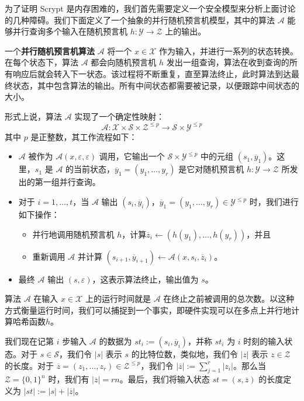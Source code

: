 \begin{snote}
为了证明 Scrypt 是内存困难的，我们首先需要定义一个安全模型来分析上面讨论的几种障碍。我们下面定义了一个抽象的并行随机预言机模型，其中的算法 $\mathcal{A}$ 能够并行查询多个输入在随机预言机 $h:\mathcal{Y}\to\mathcal{Z}$ 上的输出。

一个\textbf{并行随机预言机算法} $\mathcal{A}$ 将一个 $x\in\mathcal{X}$ 作为输入，并进行一系列的状态转换。在每个状态下，算法 $\mathcal{A}$ 都会向随机预言机 $h$ 发出一组查询，算法在收到查询的所有响应后就会转入下一状态。该过程将不断重复，直至算法终止，此时算法到达最终状态，其中包含算法的输出。所有中间状态都需要被记录，以便跟踪中间状态的大小。

形式上说，算法 $\mathcal{A}$ 实现了一个确定性映射：
$$\mathcal{A}:\mathcal{X}\times\mathcal{S}\times\mathcal{Z}^{\leq p}\to\mathcal{S}\times\mathcal{Y}^{\leq p}$$
其中 $p$ 是正整数，其工作流程如下：
\begin{itemize}
	\item $\mathcal{A}$ 被作为 $\mathcal{A}(x,\varepsilon,\varepsilon)$ 调用，它输出一个 $\mathcal{S}\times\mathcal{Y}^{\leq p}$ 中的元组 $(s_1,\overline y_1)$。这里，$s_1$ 是 $\mathcal{A}$ 的当前状态，$\overline y_1=(y_1,\dots,y_r)$ 是它对随机预言机 $h:\mathcal{Y}\to\mathcal{Z}$ 所发出的第一组并行查询。
	\item 对于 $i=1,\dots,t$，当 $\mathcal{A}$ 输出 $(s_i,\overline y_i)$，$\overline y_1=(y_1,\dots,y_r)\in\mathcal{Y}^{\leq p}$ 时，我们进行如下操作：
	\begin{itemize}
	  \item 并行地调用随机预言机 $h$，计算$\overline z_i\leftarrow (h(y_1),\dots,h(y_r))$，并且
	  \item 重新调用 $\mathcal{A}$ 并计算 $(s_{i+1},\overline y_{i+1})\leftarrow \mathcal{A}(x,s_i,\overline z_i)$。
	\end{itemize}
	\item 最终 $\mathcal{A}$ 输出 $(s,\varepsilon)$，这表示算法终止，输出值为 $s$。
\end{itemize}

算法 $\mathcal{A}$ 在输入 $x\in\mathcal{X}$ 上的运行时间就是 $\mathcal{A}$ 在终止之前被调用的总次数。以这种方式衡量运行时间，我们可以捕捉到一个事实，即硬件实现可以在多点上并行地计算哈希函数$h$。

我们现在记第 $i$ 步输入 $\mathcal{A}$ 的数据为 $st_i:=(s_i,\overline y_i)$，并称 $st_i$ 为 $i$ 时刻的输入状态。对于 $s\in\mathcal{S}$，我们令 $|s|$ 表示 $s$ 的比特位数，类似地，我们令 $|z|$ 表示 $z\in\mathcal{Z}$ 的长度。对于 $\overline z=(z_1,\dots,z_r)\in\mathcal{Z}^{\leq p}$，我们令 $|\overline z|:=\sum_{j=1}^r|z_i|$。那么当 $\mathcal{Z}=\{0,1\}^n$ 时，我们有 $|\overline z|=rn$。最后，我们将输入状态 $st=(s,\overline z)$ 的长度定义为 $|st|:=|s|+|\overline z|$。
\end{snote}

